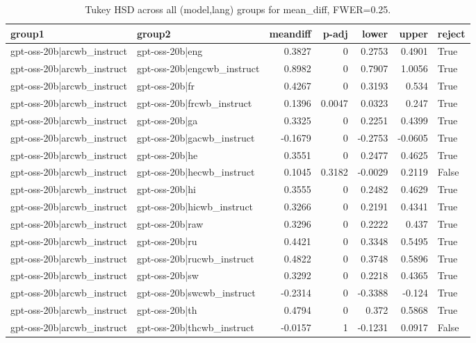 \begin{table}
\caption{Tukey HSD across all (model,lang) groups for mean_diff, FWER=0.25.}
\label{tab:tukey_all_models_all_langs_mean_diff}
\begin{tabular}{l l r r r r l}
\toprule
group1 & group2 & meandiff & p-adj & lower & upper & reject \\
\midrule
gpt-oss-20b|arcwb_instruct & gpt-oss-20b|eng & 0.3827 & 0 & 0.2753 & 0.4901 & True \\
gpt-oss-20b|arcwb_instruct & gpt-oss-20b|engcwb_instruct & 0.8982 & 0 & 0.7907 & 1.0056 & True \\
gpt-oss-20b|arcwb_instruct & gpt-oss-20b|fr & 0.4267 & 0 & 0.3193 & 0.534 & True \\
gpt-oss-20b|arcwb_instruct & gpt-oss-20b|frcwb_instruct & 0.1396 & 0.0047 & 0.0323 & 0.247 & True \\
gpt-oss-20b|arcwb_instruct & gpt-oss-20b|ga & 0.3325 & 0 & 0.2251 & 0.4399 & True \\
gpt-oss-20b|arcwb_instruct & gpt-oss-20b|gacwb_instruct & -0.1679 & 0 & -0.2753 & -0.0605 & True \\
gpt-oss-20b|arcwb_instruct & gpt-oss-20b|he & 0.3551 & 0 & 0.2477 & 0.4625 & True \\
gpt-oss-20b|arcwb_instruct & gpt-oss-20b|hecwb_instruct & 0.1045 & 0.3182 & -0.0029 & 0.2119 & False \\
gpt-oss-20b|arcwb_instruct & gpt-oss-20b|hi & 0.3555 & 0 & 0.2482 & 0.4629 & True \\
gpt-oss-20b|arcwb_instruct & gpt-oss-20b|hicwb_instruct & 0.3266 & 0 & 0.2191 & 0.4341 & True \\
gpt-oss-20b|arcwb_instruct & gpt-oss-20b|raw & 0.3296 & 0 & 0.2222 & 0.437 & True \\
gpt-oss-20b|arcwb_instruct & gpt-oss-20b|ru & 0.4421 & 0 & 0.3348 & 0.5495 & True \\
gpt-oss-20b|arcwb_instruct & gpt-oss-20b|rucwb_instruct & 0.4822 & 0 & 0.3748 & 0.5896 & True \\
gpt-oss-20b|arcwb_instruct & gpt-oss-20b|sw & 0.3292 & 0 & 0.2218 & 0.4365 & True \\
gpt-oss-20b|arcwb_instruct & gpt-oss-20b|swcwb_instruct & -0.2314 & 0 & -0.3388 & -0.124 & True \\
gpt-oss-20b|arcwb_instruct & gpt-oss-20b|th & 0.4794 & 0 & 0.372 & 0.5868 & True \\
gpt-oss-20b|arcwb_instruct & gpt-oss-20b|thcwb_instruct & -0.0157 & 1 & -0.1231 & 0.0917 & False \\

\end{tabular}
\end{table}
